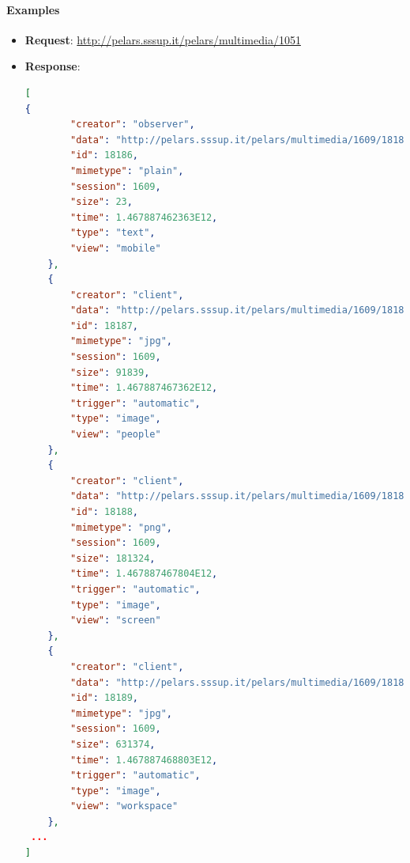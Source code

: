 \documentclass[a4paper,notitlepage,onecolumn]{hitec}  %
\begin{document}
\paragraph{Examples}
\begin{itemize}
\item \textbf{Request}:  \url{http://pelars.sssup.it/pelars/multimedia/1051} 
\item \textbf{Response}: 
\begin{lstlisting}[language=json,firstnumber=1]
[
{
        "creator": "observer",
        "data": "http://pelars.sssup.it/pelars/multimedia/1609/18186",
        "id": 18186,
        "mimetype": "plain",
        "session": 1609,
        "size": 23,
        "time": 1.467887462363E12,
        "type": "text",
        "view": "mobile"
    },
    {
        "creator": "client",
        "data": "http://pelars.sssup.it/pelars/multimedia/1609/18187",
        "id": 18187,
        "mimetype": "jpg",
        "session": 1609,
        "size": 91839,
        "time": 1.467887467362E12,
        "trigger": "automatic",
        "type": "image",
        "view": "people"
    },
    {
        "creator": "client",
        "data": "http://pelars.sssup.it/pelars/multimedia/1609/18188",
        "id": 18188,
        "mimetype": "png",
        "session": 1609,
        "size": 181324,
        "time": 1.467887467804E12,
        "trigger": "automatic",
        "type": "image",
        "view": "screen"
    },
    {
        "creator": "client",
        "data": "http://pelars.sssup.it/pelars/multimedia/1609/18189",
        "id": 18189,
        "mimetype": "jpg",
        "session": 1609,
        "size": 631374,
        "time": 1.467887468803E12,
        "trigger": "automatic",
        "type": "image",
        "view": "workspace"
    },
 ...
]
\end{lstlisting}
\end{itemize}
\end{document}
